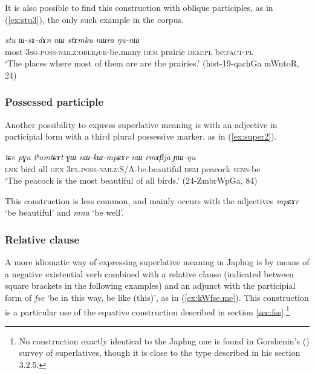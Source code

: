 \documentclass[oneside,a4paper,12pt]{article}
\newcommand{\ipa}[1]{{\phon\textit{#1}}}
\newcommand{\forme}[2]{\ipa{#1} `#2'}
\begin{document}
It is also possible to find this construction with oblique participles, as in (\ref{ex:stu3}), the only such example in the corpus.

\begin{exe}
\ex \label{ex:stu3}
\gll 
\ipa{stu} 	\ipa{ɯ-sɤ-dɤn} 	\ipa{nɯ} 	\ipa{stɤmku} 	\ipa{nɯra} 	\ipa{ŋu-nɯ} \\
most \textsc{3sg.poss-nmlz:oblique}-be.many \textsc{dem} prairie \textsc{dem:pl} be:\textsc{fact-pl} \\
\glt `The places where most of them are are the prairies.' (hist-19-qachGa mWntoR, 24)
\end{exe}

 \subsubsection{Possessed participle}
Another possibility to express superlative meaning is with an adjective in participial form  with a third plural possessive marker, as in (\ref{ex:super2}). 
 
 \begin{exe}
\ex \label{ex:super2}
\gll 
\ipa{tɕe} 	\ipa{pɣa} 	\ipa{tʰamtɕɤt} 	\ipa{ɣɯ} 	\ipa{nɯ-kɯ-mpɕɤr} 	\ipa{nɯ} 	\ipa{rmɤβja} 	\ipa{ɲɯ-ŋu} \\
\textsc{lnk} bird all \textsc{gen} \textsc{3pl.poss-nmlz}:S/A-be.beautiful \textsc{dem} peacock \textsc{sens}-be \\
\glt  `The peacock is the most beautiful of all birds.' (24-ZmbrWpGa, 84)
\end{exe}

This construction is less common, and mainly occurs with the adjectives \forme{mpɕɤr}{be beautiful} and \forme{mna}{be well}.

 \subsubsection{Relative clause} \label{sec:relative.superlative}
 A more idiomatic way of expressing superlative meaning in Japhug is by means of a negative existential verb combined with a relative clause (indicated between square brackets in the following examples) and an adjunct with the participial form of \forme{fse}{be in this way, be like (this)}, as in (\ref{ex:kWfse.me}). This construction is a particular use of the equative construction described in section \ref{sec:fse}.\footnote{No construction exactly identical to the Japhug one is found in Gorshenin's (\citeyear{gorshenin12superlative}) survey of superlatives, though it is close to the type described in his section 3.2.5.}
 
\end{document}
